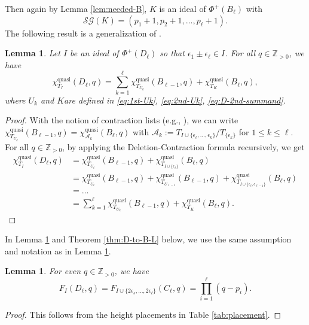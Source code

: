 \documentclass[12pt]{amsart}
\theoremstyle{plain}
\newtheorem{lemma}[theorem]{Lemma}
\theoremstyle{definition}
\theoremstyle{remark}
\newcommand{\A}{\mathcal{A}}
\newcommand{\Z}{\mathbb{Z}}
\newcommand{\quasi}{\operatorname{quasi}}
\newcommand{\SG}{{\mathcal{SG}}}
\begin{document}
Then again by Lemma \ref{lem:needed-B}, $K$ is an ideal of $\Phi^+(B_{\ell})$ with   
\begin{equation*}\label{eq:DP(K)}
   \SG(K)=(p_1+1, p_{2}+1,\ldots,p_{\ell}+1).
\end{equation*}
The following result is a generalization of \cite[Lemma 4.4(12)]{KTT07}.
\begin{lemma} \label{lem:D-to-B} 
Let $I$ be an ideal of $\Phi^+(D_\ell)$ so that $\epsilon_1\pm\epsilon_{\ell}  \in I$. 
For all $q \in \Z_{>0}$, we have
  \begin{equation}\label{eq:D-to-B}
\chi^{\quasi}_{T_{I}}(D_\ell, q)= \sum_{k=1}^{\ell}\chi^{\quasi}_{T_{U_k}}(B_{\ell-1}, q)+\chi^{\quasi}_{T_K}(B_{\ell}, q),
\end{equation}
where $U_k$ and $K$are defined in \eqref{eq:1st-Uk}, \eqref{eq:2nd-Uk}, \eqref{eq:D-2nd-summand}.
\end{lemma}
\begin{proof} 
With the notion of contraction lists (e.g., \cite[Section 2]{Tan18}), we can write $\chi^{\quasi}_{T_{U_k}}(B_{\ell-1}, q)=\chi^{\quasi}_{\A_k}(B_\ell, q)$ with $\A_k :=T_{I\cup\{\epsilon_\ell,\ldots,\epsilon_{k}\}}/T_{\{\epsilon_k\}}$ for $1 \le k \le \ell$. 
For all $q \in \Z_{>0}$, by applying the Deletion-Contraction formula \cite[Theorem 3.5]{Tan18} recursively, we get
\begin{align*}
\chi^{\quasi}_{T_{I}}(D_\ell, q)
& =  \chi^{\quasi}_{T_{U_\ell}}(B_{\ell-1}, q) + \chi^{\quasi}_{T_{I\cup\{\epsilon_\ell\}}}(B_\ell, q)\\
& =  \chi^{\quasi}_{T_{U_\ell}}(B_{\ell-1}, q) + \chi^{\quasi}_{T_{U_{\ell-1}}}(B_{\ell-1}, q) +\chi^{\quasi}_{T_{I\cup\{\epsilon_\ell, \epsilon_{\ell-1}\}}}(B_\ell, q)\\
& =\ldots\\
& =\sum_{k=1}^{\ell}\chi^{\quasi}_{T_{U_k}}(B_{\ell-1}, q)+\chi^{\quasi}_{T_K}(B_{\ell},q).
\end{align*}
\end{proof} 

 
In Lemma \ref{lem:D-to-B-F} and Theorem \ref{thm:D-to-B-L} below, we use the same assumption and notation as in Lemma \ref{lem:D-to-B}.
\begin{lemma} \label{lem:D-to-B-F} 
For even $q \in \Z_{>0}$, we have
  \begin{equation*}\label{eq:D-to-B-F}
F_I(D_\ell, q) =F_{I\cup\{2\epsilon_s,\ldots,2\epsilon_{\ell}\}}(C_\ell, q)=\prod_{i=1}^{\ell}(q-p_i).
\end{equation*}
\end{lemma}
\begin{proof} 
This follows from the height placements in Table \ref{tab:placement}.
 \end{proof} 
\end{document}
